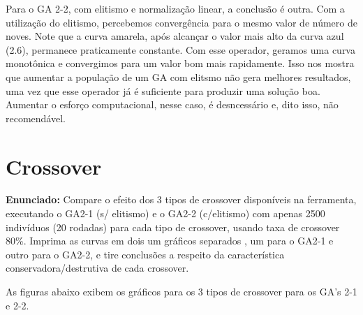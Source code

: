 \documentclass[12pt]{article}
\begin{document}
Para o GA 2-2, com elitismo e normalização linear, a conclusão é outra. Com a utilização do elitismo, percebemos convergência para o mesmo valor de número de noves. Note que a curva amarela, após alcançar o valor mais alto da curva azul (2.6), permanece praticamente constante. Com esse operador, geramos uma curva monotônica e convergimos para um valor bom mais rapidamente. Isso nos mostra que aumentar a população de um GA com elitsmo não gera melhores resultados, uma vez que esse operador já é suficiente para produzir uma solução boa. Aumentar o esforço computacional, nesse caso, é desncessário e, dito isso, não recomendável.

\section{Crossover}
\textbf{Enunciado:}
Compare o efeito dos 3 tipos de crossover disponíveis na ferramenta, executando o GA2-1 (s/ elitismo) e o GA2-2 (c/elitismo) com apenas 2500 indivíduos (20 rodadas) para cada tipo de crossover, usando taxa de crossover 80\%. Imprima as curvas em dois um gráficos separados , um para o GA2-1 e outro para o GA2-2, e tire conclusões a respeito da característica conservadora/destrutiva de cada crossover.

As figuras abaixo exibem os gráficos para os 3 tipos de crossover para os GA's 2-1 e 2-2.
\end{document}
